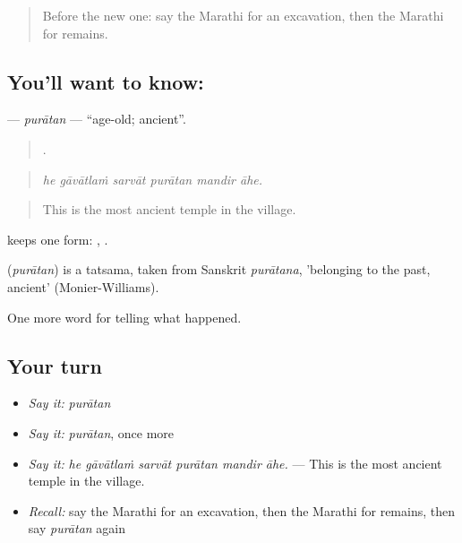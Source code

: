 \label{lesson:MR-C335-puratan}



\begin{quote}
Before the new one: say the Marathi for an excavation, then the Marathi for remains.
\end{quote}

\subsection*{You'll want to know: }
\textbf{} — \emph{purātan} — \textquotedblleft{}age-old; ancient\textquotedblright{}.

\begin{quote}
     .
\end{quote}

\begin{quote}
\emph{he gāvātlaṁ sarvāt purātan mandir āhe.}
\end{quote}

\begin{quote}
This is the most ancient temple in the village.
\end{quote}

 keeps one form:  ,  .

\begin{cousinweb}
\textbf{} (\emph{purātan}) is a tatsama, taken from Sanskrit \emph{purātana}, 'belonging to the past, ancient' (Monier-Williams).
\end{cousinweb}

\begin{grammarlens}[title={What you've built}]
One more word for telling what happened.
\end{grammarlens}

\subsection*{Your turn}
\begin{itemize}
\raggedright
  \item \emph{Say it:} \emph{purātan}
  \item \emph{Say it:} \emph{purātan}, once more
  \item \emph{Say it:} \emph{he gāvātlaṁ sarvāt purātan mandir āhe.} — This is the most ancient temple in the village.
  \item \emph{Recall:} say the Marathi for an excavation, then the Marathi for remains, then say \emph{purātan} again
\end{itemize}

